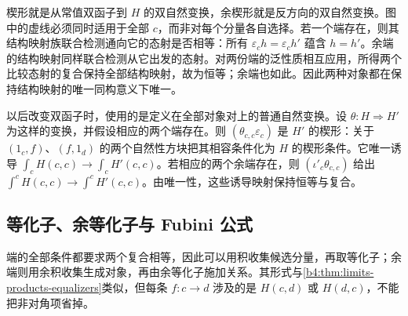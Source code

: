 楔形就是从常值双函子到 \(H\) 的双自然变换，余楔形就是反方向的双自然变换。图中的虚线必须同时适用于全部 \(c\)，而非对每个分量各自选择。若一个端存在，则其结构映射族联合检测通向它的态射是否相等：所有 \(\varepsilon_ch=\varepsilon_ch'\) 蕴含 \(h=h'\)。余端的结构映射同样联合检测从它出发的态射。对两份端的泛性质相互应用，所得两个比较态射的复合保持全部结构映射，故为恒等；余端也如此。因此两种对象都在保持结构映射的唯一同构意义下唯一。

\ProseParagraphBreak
以后改变双函子时，使用的是定义在全部对象对上的普通自然变换。设 \(\theta:H\Rightarrow H'\) 为这样的变换，并假设相应的两个端存在。则 \((\theta_{c,c}\varepsilon_c)\) 是 \(H'\) 的楔形：关于 \((1_c,f)\)、\((f,1_d)\) 的两个自然性方块把其相容条件化为 \(H\) 的楔形条件。它唯一诱导 \(\int_cH(c,c)\rightarrow\int_cH'(c,c)\)。若相应的两个余端存在，则 \((\iota'_c\theta_{c,c})\) 给出 \(\int^cH(c,c)\rightarrow\int^cH'(c,c)\)。由唯一性，这些诱导映射保持恒等与复合。

\subsection{等化子、余等化子与 Fubini 公式}
\label{b4:subsec:0306:02}

端的全部条件都要求两个复合相等，因此可以用积收集候选分量，再取等化子；余端则用余积收集生成对象，再由余等化子施加关系。其形式与\cref{b4:thm:limits-products-equalizers}类似，但每条 \(f:c\rightarrow d\) 涉及的是 \(H(c,d)\) 或 \(H(d,c)\)，不能把非对角项省掉。

